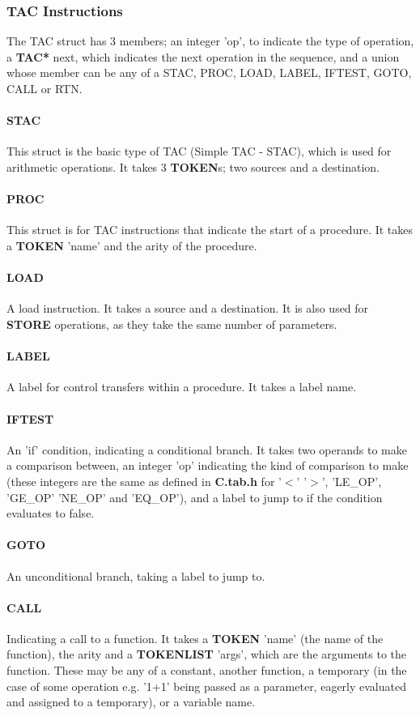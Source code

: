 \documentclass[12pt]{article}
\begin{document}
\subsubsection{TAC Instructions}
The TAC struct has 3 members; an integer 'op', to indicate the type of operation, a \textbf{TAC*} next, which indicates the next operation in the sequence, and a union whose member can be any of a
 STAC, PROC, LOAD, LABEL, IFTEST, GOTO, CALL or RTN. 
\paragraph{STAC} This struct is the basic type of TAC (Simple TAC - STAC), which is used for arithmetic operations. It takes 3 \textbf{TOKEN}s; two sources and a destination.
\paragraph{PROC} This struct is for TAC instructions that indicate the start of a procedure. It takes a \textbf{TOKEN} 'name' and the arity of the procedure. 
\paragraph{LOAD} A load instruction. It takes a source and a destination. It is also used for \textbf{STORE} operations, as they take the same number of parameters.
\paragraph{LABEL}A label for control transfers within a procedure. It takes a label name.
\paragraph{IFTEST} An 'if' condition, indicating a conditional branch. It takes two operands to make a comparison between, an integer 'op' indicating the kind of comparison to make (these integers are the same as defined in \textbf{C.tab.h} for '$<$' '$>$', 'LE\_OP', 'GE\_OP' 'NE\_OP' and 'EQ\_OP'), and a label to jump to if the condition evaluates to false. 
\paragraph{GOTO} An unconditional branch, taking a label to jump to.
\paragraph{CALL} Indicating a call to a function. It takes a \textbf{TOKEN} 'name' (the name of the function), the arity and a \textbf{TOKENLIST} 'args', which are the arguments to the function. These may be any of a constant, another function, a temporary (in the case of some operation e.g. '1+1' being passed as a parameter, eagerly evaluated and assigned to a temporary), or a variable name.
\end{document}
